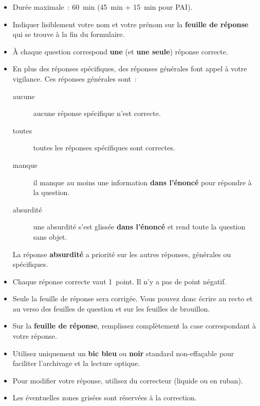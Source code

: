 \documentclass[12pt,french,a4paper,oneside]{article}
\begin{document}
\begin{examcopy}[2]
	\begin{itemize}
		\item Durée maximale~: \qty{60}{\minute} (\qty{45}{\minute} + \qty{15}{\minute} pour PAI).
		\item Indiquer lisiblement votre nom et votre prénom sur la \textbf{feuille de réponse} qui se trouve à la fin du formulaire.
		\item À chaque question correspond \textbf{une} (et \textbf{une seule}) réponse correcte.
		\item En plus des réponses spécifiques, des réponses générales font appel à votre vigilance.
		      Ces réponses générales sont~:
		      \begin{description}
			      \item[aucune] aucune réponse spécifique n'est correcte.
			      \item[toutes] toutes les réponses spécifiques sont correctes.
			      \item[manque] il manque au moins une information \textbf{dans l'énoncé} pour répondre à la question.
			      \item[absurdité] une absurdité s'est glissée \textbf{dans l'énoncé} et rend toute la question sans objet.
		      \end{description}
		      La réponse \textbf{absurdité} a priorité sur les autres réponses, générales ou spécifiques.
		\item Chaque réponse correcte vaut 1~point. Il n'y a pas de point négatif.
		\item Seule la feuille de réponse sera corrigée.
		      Vous pouvez donc écrire au recto et au verso des feuilles de question et sur les feuilles de brouillon.
		\item Sur la \textbf{feuille de réponse}, remplissez complètement la case correspondant à votre réponse.
		\item Utilisez uniquement un \textbf{bic bleu} ou \textbf{noir} standard non-effaçable pour faciliter l'archivage et la lecture optique.
		\item Pour modifier votre réponse, utilisez du correcteur (liquide ou en ruban).
		\item Les éventuelles zones grisées sont réservées à la correction.
	\end{itemize}

	\vfill{}

	\begin{center}
	\end{center}


\end{examcopy}
\end{document}
